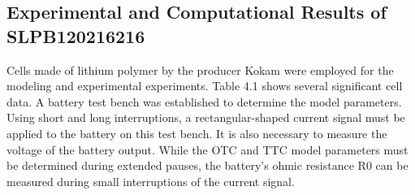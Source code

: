 \subsection{Experimental and Computational Results of SLPB120216216}
Cells made of lithium polymer by the producer Kokam were employed for the modeling and experimental experiments.
Table 4.1 shows several significant cell data. A battery test bench was established to determine the model parameters. Using short and long interruptions, a rectangular-shaped current signal must be applied to the battery on this test bench. It is also necessary to measure the voltage of the battery output. While the OTC and TTC model parameters must be determined during extended pauses, the battery's ohmic resistance R0 can be measured during small interruptions of the current signal.

